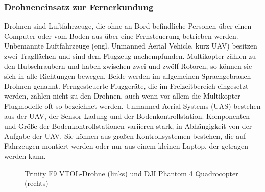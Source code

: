 \subsubsection{Drohneneinsatz zur Fernerkundung}

Drohnen sind Luftfahrzeuge, die ohne an Bord befindliche Personen über einen Computer oder vom Boden aus über eine Fernsteuerung betrieben werden. Unbemannte Luftfahrzeuge (engl. Unmanned Aerial Vehicle, kurz UAV) besitzen zwei Tragflächen und sind dem Flugzeug nachempfunden. Multikopter zählen zu den Hubschraubern und haben zwischen zwei und zwölf Rotoren, so können sie sich in alle Richtungen bewegen. Beide werden im allgemeinen Sprachgebrauch Drohnen genannt. Ferngesteuerte Fluggeräte, die im Freizeitbereich eingesetzt werden, zählen nicht zu den Drohnen, auch wenn vor allem die Multikopter Flugmodelle oft so bezeichnet werden. Unmanned Aerial Systems (UAS) bestehen aus der UAV, der Sensor-Ladung und der Bodenkontrollstation. Komponenten und Größe der Bodenkontrollstationen variieren stark, in Abhängigkeit von der Aufgabe der UAV. Sie können aus großen Kontrollsystemen bestehen, die auf Fahrzeugen montiert werden oder nur aus einem kleinen Laptop, der getragen werden kann. \citep[vgl.][]{Watts2012}

\begin{figure}[hbt]
\caption{Trinity F9 VTOL-Drohne (links) und DJI Phantom 4 Quadrocopter (rechts)}
  \label{fig:drohne}
\end{figure}

